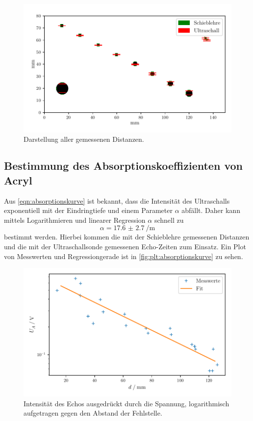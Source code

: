 \begin{figure}[H]
  \centering
  \includegraphics[width=\textwidth]{build/plt/visualization.pdf}
  \caption{Darstellung aller gemessenen Distanzen.}
  \label{fig:plt:visualization}
\end{figure}

\subsection{Bestimmung des Absorptionskoeffizienten von Acryl}
\label{sec:auswertung:absorptionskoeffizient}

Aus \autoref{eqn:absorptionskurve} ist bekannt,
dass die Intensität des Ultraschalls exponentiell mit der Eindringtiefe und einem Parameter $\alpha$ abfällt.
Daher kann mittels Logarithmieren und linearer Regression $\alpha$ schnell zu
\[ \alpha = \SI{17.6(27)}{\per\meter} \]
bestimmt werden.
Hierbei kommen die mit der Schieblehre gemessenen Distanzen
und die mit der Ultraschallsonde gemessenen Echo-Zeiten zum Einsatz.
Ein Plot von Messwerten und Regressiongerade ist in \autoref{fig:plt:absorptionskurve} zu sehen.

\begin{figure}
  \centering
  \includegraphics[width=\textwidth]{build/plt/absorptionskurve.pdf}
  \caption{Intensität des Echos ausgedrückt durch die Spannung,
  logarithmisch aufgetragen gegen den Abstand der Fehlstelle.}
  \label{fig:plt:absorptionskurve}
\end{figure}

